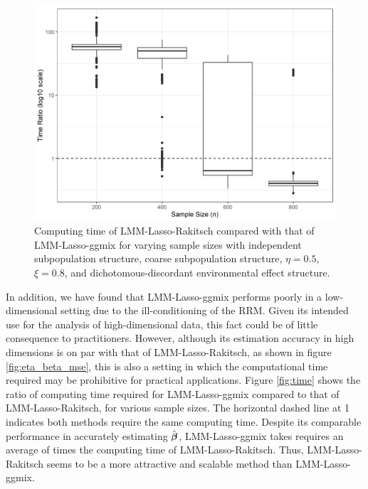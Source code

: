\begin{figure}[H]
    \centering
    \includegraphics[scale = 0.8]{figures/time_ratio_box.png}
    \caption{ Computing time of LMM-Lasso-Rakitsch compared with that of LMM-Lasso-ggmix for varying sample sizes with independent subpopulation structure, coarse subpopulation structure, $\eta = 0.5$, $\xi = 0.8$, and dichotomous-discordant environmental effect structure.}
    \label{fig:time_box}
\end{figure}



In addition, we have found that LMM-Lasso-ggmix performs poorly in a low-dimensional setting due to the ill-conditioning of the RRM. Given its intended use for the analysis of high-dimensional data, this fact could be of little consequence to practitioners. However, although its estimation accuracy in high dimensions is on par with that of LMM-Lasso-Rakitsch, as shown in figure \ref{fig:eta_beta_mse}, this is also a setting in which the computational time required may be prohibitive for practical applications. Figure \ref{fig:time} shows the ratio of computing time required for LMM-Lasso-ggmix compared to that of LMM-Lasso-Rakitsch, for various sample sizes. The horizontal dashed line at 1 indicates both methods require the same computing time. Despite its comparable performance in accurately estimating $\hat{\boldsymbol{\beta}}$, LMM-Lasso-ggmix takes requires an average of  times the computing time of LMM-Lasso-Rakitsch. Thus, LMM-Lasso-Rakitsch seems to be a more attractive and scalable method than LMM-Lasso-ggmix.


